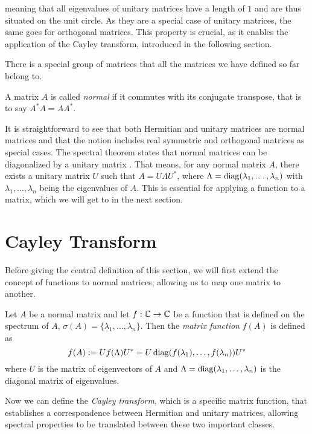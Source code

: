 meaning that all eigenvalues of unitary matrices have a length of $1$ and are thus situated on the unit circle. As they are a special case of unitary matrices, the same goes for orthogonal matrices. This property is crucial, as it enables the application of the Cayley transform, introduced in the following section.

There is a special group of matrices that all the matrices we have defined so far belong to.

\begin{definition}
    A matrix $A$ is called \emph{normal} if it commutes with its conjugate transpose,
    that is to say $A^* A = A A^*$.
\end{definition}

It is straightforward to see that both Hermitian and unitary matrices are normal matrices and that the notion includes real symmetric and orthogonal matrices as special cases. The spectral theorem states that normal matrices can be diagonalized by a unitary matrix \cite{sheldonaxler}. That means, for any normal matrix $A$, there exists a unitary matrix $U$ such that $A = U \Lambda U^*$, where $\Lambda = \operatorname{diag}(\lambda_1, \ldots, \lambda_n)$ with $\lambda_1, \ldots, \lambda_n$ being the eigenvalues of $A$. This is essential for applying a function to a matrix, which we will get to in the next section.

\section{Cayley Transform}

Before giving the central definition of this section, we will first extend the concept of functions to normal matrices, allowing us to map one matrix to another.

\begin{definition}
    Let $A$ be a normal matrix and let $f: \mathbb{C} \to \mathbb{C}$ be a function that is defined on the spectrum of $A$,
    $\sigma(A) = \{\lambda_1, \ldots, \lambda_n\}$.
    Then the \emph{matrix function} $f(A)$ is defined as
    \[
    f(A) := U f(\Lambda) U^* = U \operatorname{diag}(f(\lambda_1), \ldots, f(\lambda_n)) U^*
    \]
    where $U$ is the matrix of eigenvectors of $A$ and $\Lambda = \operatorname{diag}(\lambda_1, \ldots, \lambda_n)$ is the diagonal matrix of eigenvalues.
\end{definition}

Now we can define the \emph{Cayley transform}, which is a specific matrix function, that establishes a correspondence between Hermitian and unitary matrices, allowing spectral properties to be translated between these two important classes.

